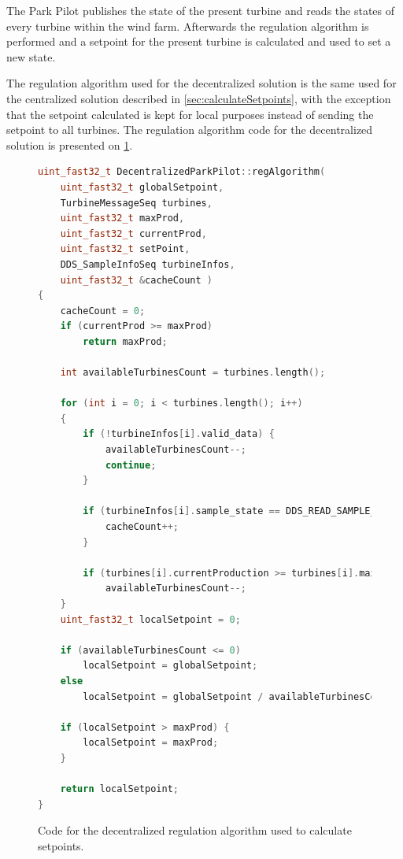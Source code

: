 The Park Pilot publishes the state of the present turbine and reads the states of every turbine within the wind farm. Afterwards the regulation algorithm is performed and a setpoint for the present turbine is calculated and used to set a new state.

The regulation algorithm used for the decentralized solution is the same used for the centralized solution described in \cref{sec:calculateSetpoints}, with the exception that the setpoint calculated is kept for local purposes instead of sending the setpoint to all turbines. The regulation algorithm code for the decentralized solution is presented on \cref{fig:decenRegAlgCode}.

\begin{figure}[!h]
	\centering
	\begin{lstlisting}[language=C++,tabsize=2,basicstyle=\small]
uint_fast32_t DecentralizedParkPilot::regAlgorithm(
	uint_fast32_t globalSetpoint,
	TurbineMessageSeq turbines,
	uint_fast32_t maxProd,
	uint_fast32_t currentProd,
	uint_fast32_t setPoint,
	DDS_SampleInfoSeq turbineInfos,
	uint_fast32_t &cacheCount )
{
	cacheCount = 0;
	if (currentProd >= maxProd)
		return maxProd;

	int availableTurbinesCount = turbines.length();

	for (int i = 0; i < turbines.length(); i++)
	{
		if (!turbineInfos[i].valid_data) {
			availableTurbinesCount--;
			continue;
		}

		if (turbineInfos[i].sample_state == DDS_READ_SAMPLE_STATE) {
			cacheCount++;
		}

		if (turbines[i].currentProduction >= turbines[i].maxProduction)
			availableTurbinesCount--;
	}
	uint_fast32_t localSetpoint = 0;

	if (availableTurbinesCount <= 0)
		localSetpoint = globalSetpoint;
	else
		localSetpoint = globalSetpoint / availableTurbinesCount;

	if (localSetpoint > maxProd) {
		localSetpoint = maxProd;
	}

	return localSetpoint;
}
	\end{lstlisting}
	\caption[The regulation algorithm of the decentralized solution]{
		\label{fig:decenRegAlgCode} 
		\footnotesize{%
			Code for the decentralized regulation algorithm used to calculate setpoints.
		}
	}
\end{figure}

